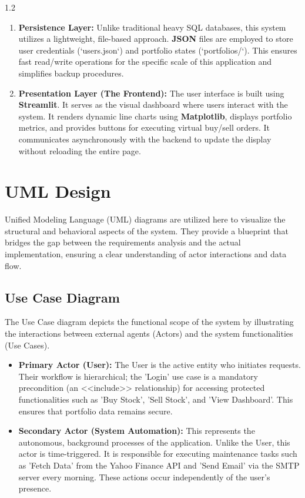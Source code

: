 \documentclass[12pt, a4paper]{report}
\begin{document}
\begin{spacing}{1.2}
\begin{enumerate}
\item \textbf{Persistence Layer:} Unlike traditional heavy SQL databases, this system utilizes a lightweight, file-based approach. \textbf{JSON} files are employed to store user credentials (`users.json`) and portfolio states (`portfolios/`). This ensures fast read/write operations for the specific scale of this application and simplifies backup procedures.

\item \textbf{Presentation Layer (The Frontend):} The user interface is built using \textbf{Streamlit}. It serves as the visual dashboard where users interact with the system. It renders dynamic line charts using \textbf{Matplotlib}, displays portfolio metrics, and provides buttons for executing virtual buy/sell orders. It communicates asynchronously with the backend to update the display without reloading the entire page.
\end{enumerate}

\section{UML Design} Unified Modeling Language (UML) diagrams are utilized here to visualize the structural and behavioral aspects of the system. They provide a blueprint that bridges the gap between the requirements analysis and the actual implementation, ensuring a clear understanding of actor interactions and data flow.

\subsection{Use Case Diagram} The Use Case diagram depicts the functional scope of the system by illustrating the interactions between external agents (Actors) and the system functionalities (Use Cases). \begin{itemize} \item \textbf{Primary Actor (User):} The User is the active entity who initiates requests. Their workflow is hierarchical; the 'Login' use case is a mandatory precondition (an <<include>> relationship) for accessing protected functionalities such as 'Buy Stock', 'Sell Stock', and 'View Dashboard'. This ensures that portfolio data remains secure. \item \textbf{Secondary Actor (System Automation):} This represents the autonomous, background processes of the application. Unlike the User, this actor is time-triggered. It is responsible for executing maintenance tasks such as 'Fetch Data' from the Yahoo Finance API and 'Send Email' via the SMTP server every morning. These actions occur independently of the user's presence. \end{itemize}


\end{spacing}
\end{document}
